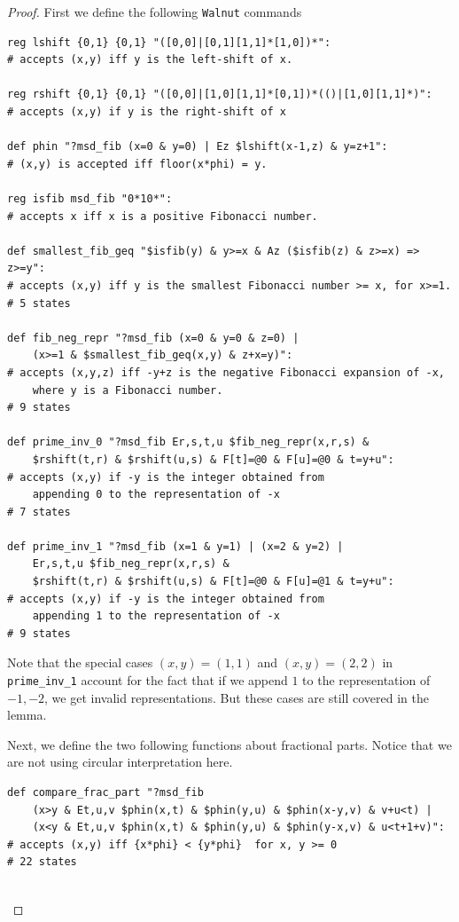 \documentclass[10pt,a4paper]{amsart}
\begin{document}
\begin{proof}%
First we define the following {\tt Walnut} commands
\begin{verbatim}
reg lshift {0,1} {0,1} "([0,0]|[0,1][1,1]*[1,0])*":
# accepts (x,y) iff y is the left-shift of x.

reg rshift {0,1} {0,1} "([0,0]|[1,0][1,1]*[0,1])*(()|[1,0][1,1]*)":
# accepts (x,y) if y is the right-shift of x

def phin "?msd_fib (x=0 & y=0) | Ez $lshift(x-1,z) & y=z+1":
# (x,y) is accepted iff floor(x*phi) = y.

reg isfib msd_fib "0*10*":
# accepts x iff x is a positive Fibonacci number.

def smallest_fib_geq "$isfib(y) & y>=x & Az ($isfib(z) & z>=x) => z>=y":
# accepts (x,y) iff y is the smallest Fibonacci number >= x, for x>=1.
# 5 states

def fib_neg_repr "?msd_fib (x=0 & y=0 & z=0) | 
    (x>=1 & $smallest_fib_geq(x,y) & z+x=y)":
# accepts (x,y,z) iff -y+z is the negative Fibonacci expansion of -x,
    where y is a Fibonacci number.
# 9 states

def prime_inv_0 "?msd_fib Er,s,t,u $fib_neg_repr(x,r,s) &
    $rshift(t,r) & $rshift(u,s) & F[t]=@0 & F[u]=@0 & t=y+u":
# accepts (x,y) if -y is the integer obtained from 
    appending 0 to the representation of -x
# 7 states

def prime_inv_1 "?msd_fib (x=1 & y=1) | (x=2 & y=2) |
    Er,s,t,u $fib_neg_repr(x,r,s) &
    $rshift(t,r) & $rshift(u,s) & F[t]=@0 & F[u]=@1 & t=y+u":
# accepts (x,y) if -y is the integer obtained from 
    appending 1 to the representation of -x
# 9 states
\end{verbatim}

Note that the special cases $(x,y)=(1,1)$ and $(x,y) = (2,2)$ in {\tt prime\_inv\_1} account for the
fact that if we append $1$ to the representation of $-1, -2$, we get invalid representations. But these cases are still covered in the lemma.

Next, we define the two following functions about fractional parts. Notice that we are not using circular interpretation here. 

\begin{verbatim}
def compare_frac_part "?msd_fib 
    (x>y & Et,u,v $phin(x,t) & $phin(y,u) & $phin(x-y,v) & v+u<t) | 
    (x<y & Et,u,v $phin(x,t) & $phin(y,u) & $phin(y-x,v) & u<t+1+v)":
# accepts (x,y) iff {x*phi} < {y*phi}  for x, y >= 0 
# 22 states


\end{verbatim}
\end{proof}
\end{document}
